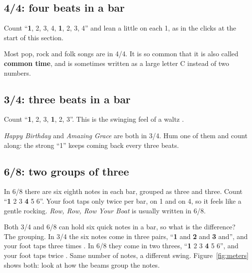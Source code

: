 \subsection*{4/4: four beats in a bar}

Count ``\textbf{1}, 2, 3, 4, \textbf{1}, 2, 3, 4'' and lean a little on each 1, as in the clicks at the start of this section.

Most pop, rock and folk songs are in 4/4. It is so common that it is also called \textbf{common time}, and is sometimes written as a large letter C instead of two numbers.

\subsection*{3/4: three beats in a bar}

Count ``\textbf{1}, 2, 3, \textbf{1}, 2, 3''. This is the swinging feel of a waltz .

\emph{Happy Birthday} and \emph{Amazing Grace} are both in 3/4. Hum one of them and count along: the strong ``1'' keeps coming back every three beats.

\subsection*{6/8: two groups of three}

In 6/8 there are six eighth notes in each bar, grouped as three and three. Count ``\textbf{1} 2 3 \textbf{4} 5 6''. Your foot taps only twice per bar, on 1 and on 4, so it feels like a gentle rocking. \emph{Row, Row, Row Your Boat} is usually written in 6/8.

Both 3/4 and 6/8 can hold six quick notes in a bar, so what is the difference? The grouping. In 3/4 the six notes come in three pairs, ``\textbf{1} and \textbf{2} and \textbf{3} and'', and your foot taps three times . In 6/8 they come in two threes, ``\textbf{1} 2 3 \textbf{4} 5 6'', and your foot taps twice . Same number of notes, a different swing. Figure~\ref{fig:meters} shows both: look at how the beams group the notes.

